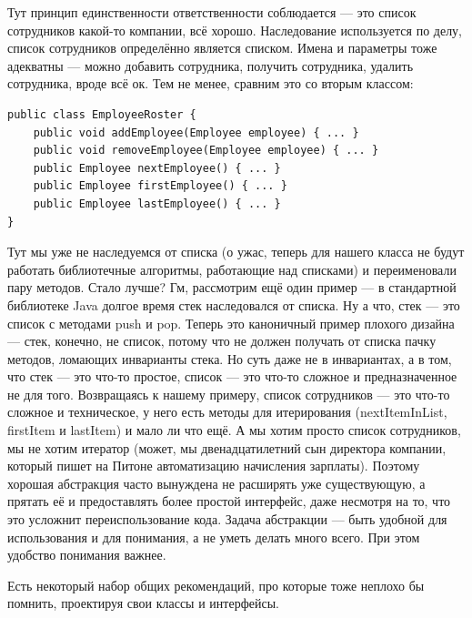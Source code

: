 \documentclass{../../text-style}
\begin{document}
Тут принцип единственности ответственности соблюдается --- это список сотрудников какой-то компании, всё хорошо. Наследование используется по делу, список сотрудников определённо является списком. Имена и параметры тоже адекватны --- можно добавить сотрудника, получить сотрудника, удалить сотрудника, вроде всё ок. Тем не менее, сравним это со вторым классом:

\begin{verbatim}
public class EmployeeRoster {
    public void addEmployee(Employee employee) { ... }
    public void removeEmployee(Employee employee) { ... }
    public Employee nextEmployee() { ... }
    public Employee firstEmployee() { ... }
    public Employee lastEmployee() { ... }
}
\end{verbatim}

Тут мы уже не наследуемся от списка (о ужас, теперь для нашего класса не будут работать библиотечные алгоритмы, работающие над списками) и переименовали пару методов. Стало лучше? Гм, рассмотрим ещё один пример --- в стандартной библиотеке Java долгое время стек наследовался от списка. Ну а что, стек --- это список с методами push и pop. Теперь это каноничный пример плохого дизайна --- стек, конечно, не список, потому что не должен получать от списка пачку методов, ломающих инварианты стека. Но суть даже не в инвариантах, а в том, что стек --- это что-то простое, список --- это что-то сложное и предназначенное не для того. Возвращаясь к нашему примеру, список сотрудников --- это что-то сложное и техническое, у него есть методы для итерирования (nextItemInList, firstItem и lastItem) и мало ли что ещё. А мы хотим просто список сотрудников, мы не хотим итератор (может, мы двенадцатилетний сын директора компании, который пишет на Питоне автоматизацию начисления зарплаты). Поэтому хорошая абстракция часто вынуждена не расширять уже существующую, а прятать её и предоставлять более простой интерфейс, даже несмотря на то, что это усложнит переиспользование кода. Задача абстракции --- быть удобной для использования и для понимания, а не уметь делать много всего. При этом удобство понимания важнее.

Есть некоторый набор общих рекомендаций, про которые тоже неплохо бы помнить, проектируя свои классы и интерфейсы.
\end{document}
